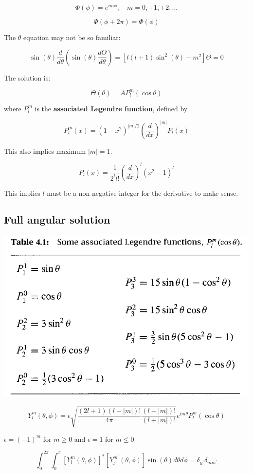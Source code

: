 \documentclass{article}
\begin{document}
$$\Phi(\phi) = e^{i m \phi}, \quad m = 0,\pm 1, \pm 2,...$$

$$\Phi(\phi + 2 \pi) = \Phi(\phi)$$

The $\theta$ equation may not be so familiar:

$$\sin (\theta) \frac{d}{d \theta} \left( \sin(\theta) \frac{d \Theta}{d \theta} \right) = \left[ l(l+1) \sin^2 (\theta) - m^2 \right] \Theta = 0$$


The solution is:

$$\Theta(\theta) = A P_l^m (\cos \theta)$$

where $P_l^m$ is the \textbf{associated Legendre function}, defined by

$$P_l^m(x) = (1-x^2)^{|m|/2} \left( \frac{d}{dx} \right)^{|m|} P_l(x)$$

This also implies maximum $|m| = 1$.

$$P_l(x) = \frac{1}{2^l l!} \left( \frac{d}{dx} \right)^l (x^2 - 1)^l$$

This implies $l$ must be a non-negative integer for the derivative to make sense. 


\subsection{Full angular solution}


\includegraphics[width=  0.6 \textwidth]{Lecture20/2.png}

$$Y_{l}^{m}(\theta, \phi)=\epsilon \sqrt{\frac{(2 l+1)(l-|m|) !}{4 \pi} \frac{(l-|m|) !}{(l+|m|) !}} e^{i m \theta} P_{l}^{m}(\cos \theta)$$

$\epsilon=(-1)^{m}$ for $m \geq 0$ and $\epsilon=1$ for $m \leq 0$

$$\int_{0}^{2 \pi} \int_{0}^{\pi}\left[Y_{l}^{m}(\theta, \phi)\right]^{*}\left[Y_{l^{\prime}}^{m^{\prime}}(\theta, \phi)\right] \sin (\theta) d \theta d \phi=\delta_{l l^{\prime}} \delta_{m m^{\prime}}$$
\end{document}
